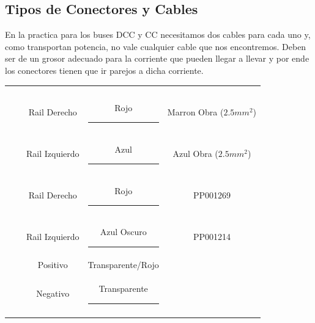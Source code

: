 \subsection{Tipos de Conectores y Cables}
En la practica para los buses DCC y CC necesitamos dos cables para cada uno y, como transportan potencia, no vale cualquier cable que nos encontremos. Deben ser de un grosor adecuado para la corriente que pueden llegar a llevar y por ende los conectores tienen que ir parejos a dicha corriente. 

\begin{table}[H]
    \centering
    \renewcommand\theadfont{\bfseries}
    \setlength{\tabcolsep}{10pt}
    \renewcommand{\arraystretch}{1.5}

    \begin{tabular}{|c|c|c|c|c|}
        \Xhline{2\arrayrulewidth}
          \\
        \Xhline{2\arrayrulewidth}
		 &  &  &  & \thead[b]{codigo} \\
		\Xhline{2\arrayrulewidth}
		 & & Rail Derecho & Rojo \colorbox{red}{\textcolor{red}{\rule{3pt}{6pt}}} & Marron Obra ($2.5mm^2$)  \\ \cline{3-5}
		&  & Rail Izquierdo & Azul \colorbox{RoyalBlue}{\textcolor{RoyalBlue}{\rule{3pt}{6pt}}} &  Azul Obra ($2.5mm^2$) \\
		\Xhline{2\arrayrulewidth}
		 & & Rail Derecho  & Rojo \colorbox{red}{\textcolor{red}{\rule{3pt}{6pt}}} & PP001269 \\ \cline{3-5}
		&  & Rail Izquierdo & Azul Oscuro \colorbox{blue}{\textcolor{blue}{\rule{3pt}{6pt}}} & PP001214 \\
		\Xhline{2\arrayrulewidth}
		 &  & Positivo & Transparente/Rojo  &  \\ \cline{3 - 4}
		&  & Negativo & Transparente \colorbox{Melon}{\textcolor{Melon}{\rule{3pt}{6pt}}} &  \\
		\Xhline{2\arrayrulewidth}

\end{tabular}
\end{table}
